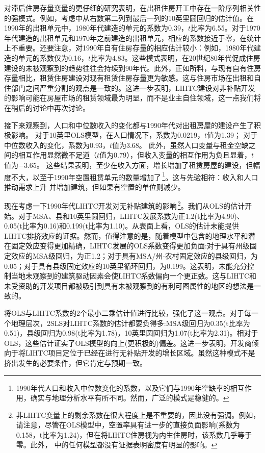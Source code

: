 \documentclass[lang=cn,11pt,a4paper]{paper}
\begin{document}
对滞后住房存量变量的更仔细的研究表明，在出租住房开工中存在一阶序列相关性的强模式。例如，考虑中从右数第二列到最后一列的10英里圆回归的估计值。在1990年的出租单元中，1980年代建造的单元的系数为0.39，$t$比率为6.55。对于1970年代建造的出租单元和1970年之前建造的出租单元，相应的系数接近于零，在统计上不重要。还要注意，对1990年自有住房存量的相应估计较小：例如，1980年代建造的单元的系数仅为0.16，$t$比率为4.83。这些模式表明，在20世纪80年代促成住房建设的未被观察到的趋势往往会持续到90年代。此外，正如所料，与现有自有住房存量相比，租赁住房建设对现有租赁住房存量更为敏感。这与住房市场在出租和自住部门之间严重分割的观点是一致的。这进一步表明，LIHTC建设对非补贴开发的影响可能在房屋市场的租赁领域最为明显，而不是业主自住领域，这一点我们将在稍后的讨论中再次讨论。

接下来观察到，人口和中位数收入的变化都与1990年代对出租房屋的建设产生了积极影响。 对于10英里OLS模型，在人口情况下，系数为0.0219，$t$值为1.39； 对于中位数收入的变化，系数为0.93，$t$值为3.68。 此外，虽然人口变量与租金空缺之间的相互作用显然微不足道（$t$值为0.79），但收入变量的相互作用为负且显着，$t$值为−3.65。 这些结果表明，至少在收入方面，增长增加了租赁房屋的建设，但幅度不大，以至于1990年空置租赁单元的数量增加了\,\footnote{1990年代人口和收入中位数变化的系数，以及它们与1990年空缺率的相互作用，确实与地理分析水平有所不同。然而，广泛的模式是稳健的。}。这与先验相符：收入和人口推动需求上升 并增加建筑，但如果有空置的单位则减少。

现在考虑一下1990年代LIHTC开发对无补贴建筑的影响\,\footnote{非LIHTC变量上的剩余系数在很大程度上是不重要的，因此没有强调。例如，请注意，尽管在OLS模型中，空置率具有进一步的直接负面影响(系数为0.158，t比率为1.24)，但在将LIHTC住房视为内生住房时，该系数几乎等于零。此外， 中的任何模型都没有证据表明密度有明显的影响。}。我们从OLS的估计开始。对于MSA、县和10英里圆回归，LIHTC发展系数为正1.2(t比率为4.90)、0.05(t比率为0.16)和0.199(t比率为1.10)。从表面上看，OLS的估计未能提供LIHTC排挤效应的证据。然而，值得注意的是，随着模型中包含的地理水平和潜在固定效应变得更加精确，LIHTC发展的OLS系数变得更加负面:对于具有州级固定效应的MSA级回归，为正1.2；对于具有MSA/州-农村固定效应的县级回归，为0.05；对于具有县级固定效应的10英里循环回归，为0.199。这表明，未能充分控制当地未观察到的建筑驱动因素会使LIHTC系数偏向一个更正数。这与LIHTC和未受资助的开发项目都被吸引到具有未被观察到的有利可图属性的地区的想法是一致的。

将OLS与LIHTC系数的2个最小二乘估计值进行比较，强化了这一观点。对于每一个地理层次，2SLS对LIHTC系数的估计都要负得多:MSA级回归为0.35(t比率为0.51)，县级回归为0.98(t比率为1.78)，10英里圆回归为1.07(t比率为2.31)。相对于OLS，这些估计证实了OLS模型的向上(更积极的)偏差。这进一步表明，开发商倾向于将LIHTC项目定位于已经在进行无补贴开发的增长区域。虽然这种模式不是挤出发生的必要条件，但它肯定与预期一致。
\end{document}
